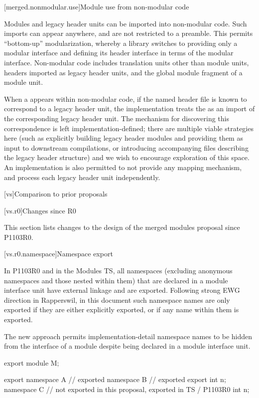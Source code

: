 [merged.nonmodular.use]{Module use from non-modular code}

\pnum
Modules and legacy header units can be imported into non-modular code.
Such imports can appear anywhere, and are not restricted to a preamble.
This permits ``bottom-up'' modularization,
whereby a library switches to providing only a modular interface
and defining its header interface in terms of the modular interface.
Non-modular code includes translation units other than module units,
headers imported as legacy header units, and the global module fragment
of a module unit.

\pnum
When a  appears within non-modular code,
if the named header file is known to correspond to a legacy header unit,
the implementation treats the  as an import
of the corresponding legacy header unit.
The mechanism for discovering this correspondence
is left implementation-defined;
there are multiple viable strategies here
(such as explicitly building legacy header modules and
providing them as input to downstream compilations, or
introducing accompanying files describing the legacy header structure)
and we wish to encourage exploration of this space.
An implementation is also permitted to not provide any mapping mechanism,
and process each legacy header unit independently.

[vs]{Comparison to prior proposals}

[vs.r0]{Changes since R0}

\pnum
This section lists changes to the design of the merged modules proposal
since P1103R0.

[vs.r0.namespace]{Namespace export}

\pnum
In P1103R0 and in the Modules TS,
all namespaces
(excluding anonymous namespaces and those nested within them)
that are declared in a module interface unit
have external linkage and
are exported.
Following strong EWG direction in Rapperswil,
in this document such namespace names
are only exported if they are either
explicitly exported, or
if any name within them is exported.
\begin{note}
The new approach permits implementation-detail namespace names
to be hidden from the interface of a module
despite being declared in a module interface unit.
\end{note}
\begin{example}
\begin{codeblock}
export module M;

export namespace A {} // exported
namespace B {         // exported
  export int n;
}
namespace C {         // not exported in this proposal, exported in TS / P1103R0
  int n;
}
\end{codeblock}
\end{example}

